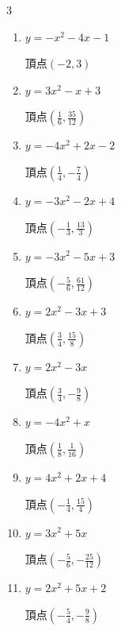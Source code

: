 \begin{multicols}{3}
\begin{enumerate}
  \item $\displaystyle y=-x^{2}-4x-1$

        $\displaystyle 頂点\left( -2 , 3 \right)$

  \item $\displaystyle y=3x^{2}-x+3$

        $\displaystyle 頂点\left( \frac{1}{6} , \frac{35}{12} \right)$

\columnbreak %

  \item $\displaystyle y=-4x^{2}+2x-2$

        $\displaystyle 頂点\left( \frac{1}{4} , -\frac{7}{4} \right)$

  \item $\displaystyle y=-3x^{2}-2x+4$

        $\displaystyle 頂点\left( -\frac{1}{3} , \frac{13}{3} \right)$

  \item $\displaystyle y=-3x^{2}-5x+3$

        $\displaystyle 頂点\left( -\frac{5}{6} , \frac{61}{12} \right)$

  \item $\displaystyle y=2x^{2}-3x+3$

        $\displaystyle 頂点\left( \frac{3}{4} , \frac{15}{8} \right)$

  \item $\displaystyle y=2x^{2}-3x$

        $\displaystyle 頂点\left( \frac{3}{4} , -\frac{9}{8} \right)$

\columnbreak %

\resetques

  \item $\displaystyle y=-4x^{2}+x$

        $\displaystyle 頂点\left( \frac{1}{8} , \frac{1}{16} \right)$

  \item $\displaystyle y=4x^{2}+2x+4$

        $\displaystyle 頂点\left( -\frac{1}{4} , \frac{15}{4} \right)$

  \item $\displaystyle y=3x^{2}+5x$

        $\displaystyle 頂点\left( -\frac{5}{6} , -\frac{25}{12} \right)$

  \item $\displaystyle y=2x^{2}+5x+2$

        $\displaystyle 頂点\left( -\frac{5}{4} , -\frac{9}{8} \right)$


\end{enumerate}
\end{multicols}
